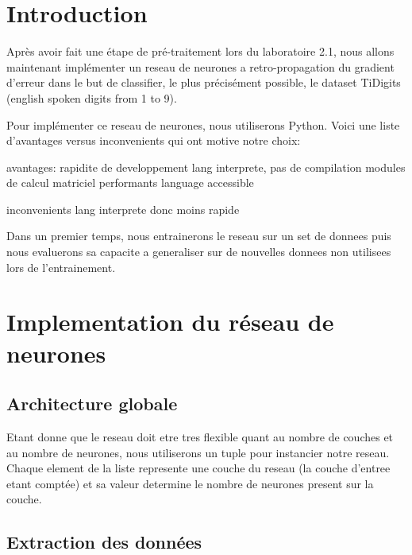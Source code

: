 \documentclass[11pt]{article}
\date{}
\begin{document}
\def \ETScourse {ELE778-01 - Intelligence artificielle: réseaux neuroniques
et systèmes experts}
\def \ETStitle {Laboratoire 2}
\def \ETSprof  {Cynthia \textsc{Moussa}}
\def \ETSauthA {Liam \textsc{Beguin}\\\emph{BEGL02129304}}
\def \ETSauthB {Louis \textsc{Laporte}\\\emph{LAPL14128903}}


\section{Introduction}
Après avoir fait une étape de pré-traitement lors du laboratoire 2.1, nous
allons maintenant implémenter un reseau de neurones a retro-propagation du
gradient d’erreur dans le but de classifier, le plus précisément possible,
le dataset TiDigits (english spoken digits from 1 to 9).

Pour implémenter ce reseau de neurones, nous utiliserons Python.
Voici une liste d'avantages versus inconvenients qui ont motive notre choix:
\begin{itemize*}
\item avantages:
	\subitem rapidite de developpement
		\subitem lang interprete, pas de compilation
		\subitem modules de calcul matriciel performants
		\subitem language accessible
	\item{inconvenients}
		\subitem lang interprete donc moins rapide \\
\end{itemize*}

Dans un premier temps, nous entrainerons le reseau sur un set de donnees puis
nous evaluerons sa capacite a generaliser sur de nouvelles donnees non utilisees
lors de l'entrainement.

\section{Implementation du r\'eseau de neurones}
\subsection{Architecture globale}
Etant donne que le reseau doit etre tres flexible quant au nombre de couches
et au nombre de neurones, nous utiliserons un tuple pour instancier
notre reseau. Chaque element de la liste represente une couche du reseau
(la couche d'entree etant compt\'ee) et sa valeur determine le nombre de neurones
present sur la couche.

\subsection{Extraction des donn\'ees}
\end{document}
